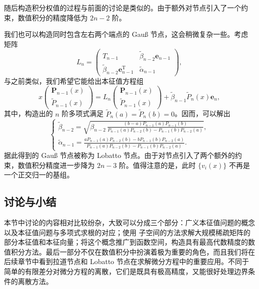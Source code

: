 随后构造积分权值的过程与前面的讨论是类似的。由于额外对节点引入了一个约束，数值积分的精度降低为 $2n-2$ 阶。

我们也可以构造同时包含左右两个端点的 Gauß 节点，这会稍微复杂一些。考虑矩阵
\begin{equation}
L_n=
\begin{pmatrix}
T_{n-1}&\tilde\beta_{n-2}\bm e_{n-1}\\
\tilde\beta_{n-2}\bm e_{n-1}^{\mathrm T}&\tilde\alpha_{n-1}
\end{pmatrix},
\tag{3.5.52}
\end{equation}
与之前类似，我们希望它能给出本征值方程组
\begin{equation}
x
\begin{pmatrix}\bm P_{n-1}(x)\\\tilde P_{n-1}(x)\end{pmatrix}
=L_n
\begin{pmatrix}\bm P_{n-1}(x)\\\tilde P_{n-1}(x)\end{pmatrix}
+\tilde\beta_{n-1}\tilde P_n(x)\bm e_n,
\tag{3.5.53}
\end{equation}
其中，构造出的 $n$ 阶多项式满足 $\tilde P_n(a)=\tilde P_n(b)=0$。因而，可以解出
\begin{equation}
\begin{cases}
\displaystyle
\tilde\beta_{n-2}=\sqrt{\beta_{n-2}\,
\frac{(b-a)P_{n-1}(a)P_{n-1}(b)}
{P_{n-1}(a)P_{n-2}(b)-P_{n-1}(b)P_{n-2}(a)}},\\[3ex]
\displaystyle
\tilde\alpha_{n-1}=\frac{aP_{n-1}(a)P_{n-2}(b)-bP_{n-1}(b)P_{n-2}(a)}
{P_{n-1}(a)P_{n-2}(b)-P_{n-1}(b)P_{n-2}(a)}.
\end{cases}
\tag{3.5.54}
\end{equation}
据此得到的 Gauß 节点被称为 Lobatto 节点。由于对节点引入了两个额外的约束，数值积分精度进一步降为 $2n-3$ 阶。值得注意的是，此时 $\{v_i(x)\}$ 不再是一个正交归一的基组。

\subsection{讨论与小结}

本节中讨论的内容相对比较纷杂，大致可以分成三个部分：广义本征值问题的概念以及本征值问题与多项式求根的对应；使用  子空间的方法求解大规模稀疏矩阵的部分本征值和本征向量；将这个概念推广到函数空间，构造具有最高代数精度的数值积分方法。最后一部分不仅在数值积分中扮演着极为重要的角色，而且我们将在后续章节中看到拉道节点和 Lobatto 节点在求解微分方程中的重要应用。不同于简单的有限差分对微分方程的离散，它们是既具有极高精度，又能很好处理边界条件的离散方法。

